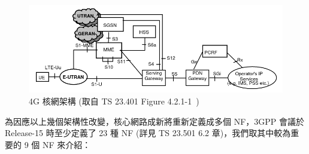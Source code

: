 \begin{figure}[htbp]
    \centering
    \includegraphics[height=!,width=1\linewidth,keepaspectratio=true]{figures/23_401_4_2_1-1_eps_arch.png}
    \caption[4G 核網架構]{{\footnotesize 4G 核網架構 (取自 TS 23.401 Figure 4.2.1-1~\cite{3gpp.23.401})}}
    \label{fig:4g_core_arch}
\end{figure}


為因應以上幾個架構性改變，核心網路成新將重新定義成多個 NF，3GPP 會議於 Release-15 時至少定義了 23 種 NF (詳見 TS 23.501 6.2 章)，我們取其中較為重要的 9 個 NF 來介紹：

